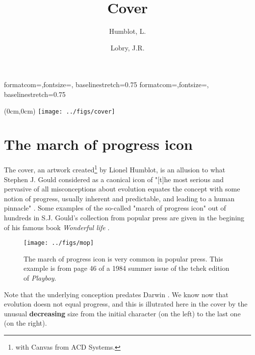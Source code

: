 \documentclass[a4paper]{article}
\title{Cover}
\author{Humblot, L. \and Lobry, J.R.}
\begin{document}
%
%
{formatcom={\color{Sinput}},fontsize=\footnotesize, baselinestretch=0.75}
{formatcom={\color{Soutput}},fontsize=\footnotesize, baselinestretch=0.75}
%
%
\newcommand{\Rlogo}{\protect\texttt{[image: ../figs/Rlogo.pdf]}}
%
%
\newcommand{\seqinr}{\texttt{seqin\bf{R}}}
\newcommand{\Seqinr}{\texttt{Seqin\bf{R}}}
%
%
%
%
%


\maketitle
\newpage

\thispagestyle{empty}
\atxy(0cm,0cm) {\texttt{[image: ../figs/cover]}}
\clearpage
\newpage

\section*{The march of progress icon}

The cover, an artwork created\footnote{
with Canvas from  ACD Systems.}
by Lionel Humblot, is an allusion to what
Stephen J. Gould considered as a caonical icon of "[t]he most serious 
and pervasive of all misconceptions about evolution equates the 
concept with some notion of progress, usually inherent and predictable, 
and leading to a human pinnacle" \cite{GouldSJ1995}. Some examples
of the so-called "march of progress icon" out of hundreds in S.J. 
Gould's collection from popular press are given in the begining of his 
famous book \textit{Wonderful life} \cite{GouldSJ1989}.

\begin{figure}
\texttt{[image: ../figs/mop]}
\caption{The march of progress icon is very common in popular press. This
example is from page 46 of a 1984 summer issue of the tchek edition 
of \textit{Playboy}.}
\label{mop}
\end{figure}

Note that the underlying conception predates Darwin \cite{LovejoyAO1936}.
We know now that evolution doesn not equal progress, and this is illutrated
here in the cover by the unusual \textbf{decreasing} size from the initial 
character (on the left) to the last one (on the right).
\end{document}
